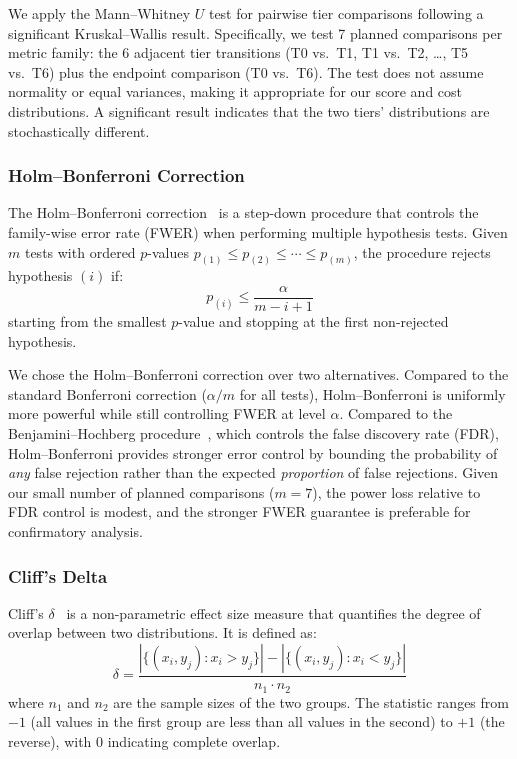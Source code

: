 \documentclass[11pt]{article}
\begin{document}
We apply the Mann--Whitney $U$ test for pairwise tier comparisons following a
significant Kruskal--Wallis result. Specifically, we test 7 planned
comparisons per metric family: the 6 adjacent tier transitions (T0 vs.\ T1,
T1 vs.\ T2, \ldots, T5 vs.\ T6) plus the endpoint comparison (T0 vs.\ T6).
The test does not assume normality or equal variances, making it appropriate
for our score and cost distributions. A significant result indicates that the
two tiers' distributions are stochastically different.

\subsubsection{Holm--Bonferroni Correction}
\label{sec:holm_bonferroni}

The Holm--Bonferroni correction~\cite{holm1979simple} is a step-down procedure
that controls the family-wise error rate (FWER) when performing multiple
hypothesis tests. Given $m$ tests with ordered $p$-values $p_{(1)} \leq
p_{(2)} \leq \cdots \leq p_{(m)}$, the procedure rejects hypothesis $(i)$ if:
\begin{equation}
  p_{(i)} \leq \frac{\alpha}{m - i + 1}
\end{equation}
starting from the smallest $p$-value and stopping at the first non-rejected
hypothesis.

We chose the Holm--Bonferroni correction over two alternatives. Compared to the
standard Bonferroni correction ($\alpha/m$ for all tests), Holm--Bonferroni is
uniformly more powerful while still controlling FWER at level $\alpha$. Compared
to the Benjamini--Hochberg procedure~\cite{benjamini1995controlling}, which
controls the false discovery rate (FDR), Holm--Bonferroni provides stronger
error control by bounding the probability of \emph{any} false rejection rather
than the expected \emph{proportion} of false rejections. Given our small number
of planned comparisons ($m = 7$), the power loss relative to FDR control is
modest, and the stronger FWER guarantee is preferable for confirmatory analysis.

\subsubsection{Cliff's Delta}
\label{sec:cliffs_delta}

Cliff's $\delta$~\cite{cliff1993dominance} is a non-parametric effect size
measure that quantifies the degree of overlap between two distributions. It is
defined as:
\begin{equation}
  \delta = \frac{\left|\{(x_i, y_j) : x_i > y_j\}\right| -
                  \left|\{(x_i, y_j) : x_i < y_j\}\right|}{n_1 \cdot n_2}
\end{equation}
where $n_1$ and $n_2$ are the sample sizes of the two groups. The statistic
ranges from $-1$ (all values in the first group are less than all values in the
second) to $+1$ (the reverse), with 0 indicating complete overlap.
\end{document}
